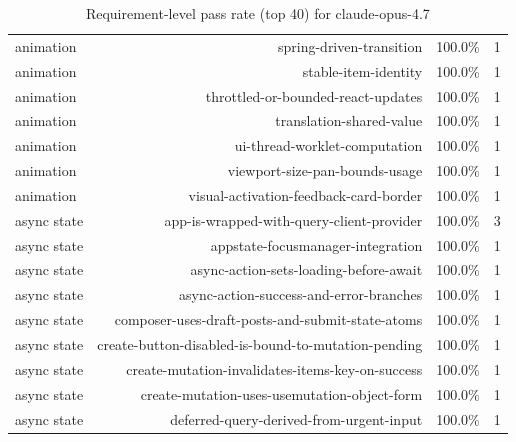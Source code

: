 \begin{table}[htbp]
\begin{tabular}{lrrr}
animation & spring-driven-transition & 100.0\% & 1 \\
animation & stable-item-identity & 100.0\% & 1 \\
animation & throttled-or-bounded-react-updates & 100.0\% & 1 \\
animation & translation-shared-value & 100.0\% & 1 \\
animation & ui-thread-worklet-computation & 100.0\% & 1 \\
animation & viewport-size-pan-bounds-usage & 100.0\% & 1 \\
animation & visual-activation-feedback-card-border & 100.0\% & 1 \\
async state & app-is-wrapped-with-query-client-provider & 100.0\% & 3 \\
async state & appstate-focusmanager-integration & 100.0\% & 1 \\
async state & async-action-sets-loading-before-await & 100.0\% & 1 \\
async state & async-action-success-and-error-branches & 100.0\% & 1 \\
async state & composer-uses-draft-posts-and-submit-state-atoms & 100.0\% & 1 \\
async state & create-button-disabled-is-bound-to-mutation-pending & 100.0\% & 1 \\
async state & create-mutation-invalidates-items-key-on-success & 100.0\% & 1 \\
async state & create-mutation-uses-usemutation-object-form & 100.0\% & 1 \\
async state & deferred-query-derived-from-urgent-input & 100.0\% & 1 \\
\bottomrule
\end{tabular}
\caption{Requirement-level pass rate (top 40) for claude-opus-4.7}
\end{table}

